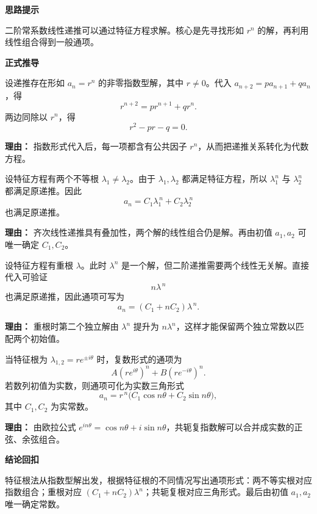 \begin{proofbox}
	\textbf{\textcolor{CProof}{思路提示}}

	二阶常系数线性递推可以通过特征方程求解。核心是先寻找形如 \(r^n\) 的解，再利用线性组合得到一般通项。

	\medskip
	\textbf{\textcolor{CProof}{正式推导}}
	\begin{description}[style=nextline, leftmargin=2.8em, labelsep=0.5em, itemsep=0.55em]
		\item[\textbf{步骤一（导出特征方程）：}]
		      设递推存在形如 \(a_n=r^n\) 的非零指数型解，其中 \(r\neq0\)。代入
		      \(a_{n+2}=p a_{n+1}+q a_n\)，得
		      \[
			      r^{n+2}=p r^{n+1}+q r^n.
		      \]
		      两边同除以 \(r^n\)，得
		      \[
			      r^2-pr-q=0.
		      \]
		      \par\textbf{理由：} 指数形式代入后，每一项都含有公共因子 \(r^n\)，从而把递推关系转化为代数方程。

		\item[\textbf{步骤二（不等根情形）：}]
		      设特征方程有两个不等根 \(\lambda_1\neq\lambda_2\)。由于 \(\lambda_1,
		      \lambda_2\) 都满足特征方程，所以 \(\lambda_1^n\) 与 \(\lambda_2^n\) 都满足原递推。因此
		      \[
			      a_n=C_1\lambda_1^{\,n}+C_2\lambda_2^{\,n}
		      \]
		      也满足原递推。
		      \par\textbf{理由：} 齐次线性递推具有叠加性，两个解的线性组合仍是解。再由初值 \(a_1,a_2\) 可唯一确定 \(C_1,C_2\)。

		\item[\textbf{步骤三（等根情形）：}]
		      设特征方程有重根 \(\lambda\)。此时 \(\lambda^n\) 是一个解，但二阶递推需要两个线性无关解。直接代入可验证
		      \[
			      n\lambda^{\,n}
		      \]
		      也满足原递推，因此通项可写为
		      \[
			      a_n=(C_1+nC_2)\lambda^{\,n}.
		      \]
		      \par\textbf{理由：} 重根时第二个独立解由 \(\lambda^n\) 提升为 \(n\lambda^n\)，这样才能保留两个独立常数以匹配两个初始值。

		\item[\textbf{步骤四（共轭复根情形）：}]
		      当特征根为 \(\lambda_{1,2}=re^{\pm i\theta}\) 时，复数形式的通项为
		      \[
			      A(re^{i\theta})^n+B(re^{-i\theta})^n.
		      \]
		      若数列初值为实数，则通项可化为实数三角形式
		      \[
			      a_n=r^{\,n}\bigl(C_1\cos n\theta+C_2\sin n\theta\bigr),
		      \]
		      其中 \(C_1,C_2\) 为实常数。
		      \par\textbf{理由：} 由欧拉公式 \(e^{in\theta}=\cos n\theta+i\sin n\theta\)，共轭复指数解可以合并成实数的正弦、余弦组合。
	\end{description}

	\medskip
	\textbf{\textcolor{CProof}{结论回扣}}

	特征根法从指数型解出发，根据特征根的不同情况写出通项形式：两不等实根对应指数组合；重根对应 \((C_1+nC_2)\lambda^n\)；共轭复根对应三角形式。最后由初值 \(a_1,a_2\) 唯一确定常数。
\end{proofbox}